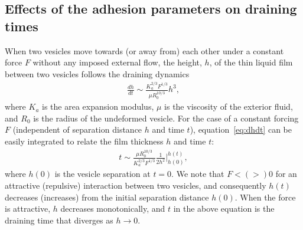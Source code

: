 \documentclass[prf,superscriptaddress,showpacs]{revtex4-1}
\begin{document}
\subsection{Effects of the adhesion parameters on draining times}
\label{subsec:qflow_draining_times}
When two vesicles move towards (or away from) each other under a
constant force $F$ without any imposed external flow, the height, $h$, of
the thin liquid film between two vesicles follows the draining
dynamics~\cite{RamachandranLeal2010_PoF}
\begin{align}
  \label{eq:dhdt}
  \frac{d h}{dt} \sim \frac{K_a^{2/3} F^{1/3}}{\mu R_0^{10/3}} h^3,
\end{align}
where $K_a$ is the area expansion modulus, $\mu$ is the viscosity of the
exterior fluid, and $R_0$ is the radius of the undeformed vesicle.  For
the case of a constant forcing $F$ (independent of separation distance
$h$ and time $t$), equation~\eqref{eq:dhdt} can be easily integrated to
relate the film thickness $h$ and time $t$:
\begin{align*}
  t \sim \frac{\mu R_0^{10/3}}{K_a^{2/3} F^{1/3}}
    \frac{1}{2 h^2} \bigg|^{h(t)}_{h(0)},
\end{align*}
where $h(0)$ is the vesicle separation at $t=0$.  We note that $F< (>)
0$ for an attractive  (repulsive) interaction between two vesicles,  and
consequently $h(t)$ decreases (increases) from  the initial separation
distance $h(0)$.  When the force is attractive, $h$ decreases
monotonically, and $t$ in the above equation is the draining time that
diverges as $h\rightarrow 0$.
\end{document}
